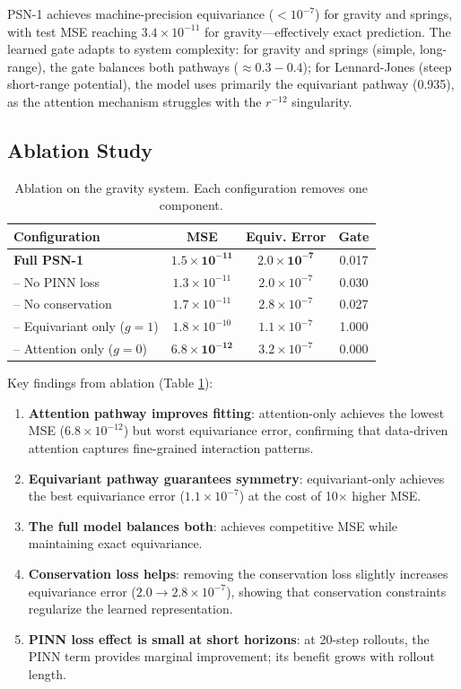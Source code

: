 \documentclass[11pt,a4paper]{article}
\begin{document}
PSN-1 achieves machine-precision equivariance ($<10^{-7}$) for gravity and springs, with test MSE reaching $3.4 \times 10^{-11}$ for gravity---effectively exact prediction. The learned gate adapts to system complexity: for gravity and springs (simple, long-range), the gate balances both pathways ($\approx 0.3-0.4$); for Lennard-Jones (steep short-range potential), the model uses primarily the equivariant pathway (0.935), as the attention mechanism struggles with the $r^{-12}$ singularity.

\subsection{Ablation Study}

\begin{table}[H]
\centering
\caption{Ablation on the gravity system. Each configuration removes one component.}
\label{tab:ablation}
\begin{tabular}{lccc}
\toprule
Configuration & MSE & Equiv. Error & Gate \\
\midrule
\textbf{Full PSN-1} & $\mathbf{1.5 \times 10^{-11}}$ & $\mathbf{2.0 \times 10^{-7}}$ & 0.017 \\
-- No PINN loss & $1.3 \times 10^{-11}$ & $2.0 \times 10^{-7}$ & 0.030 \\
-- No conservation & $1.7 \times 10^{-11}$ & $2.8 \times 10^{-7}$ & 0.027 \\
-- Equivariant only ($g=1$) & $1.8 \times 10^{-10}$ & $1.1 \times 10^{-7}$ & 1.000 \\
-- Attention only ($g=0$) & $\mathbf{6.8 \times 10^{-12}}$ & $3.2 \times 10^{-7}$ & 0.000 \\
\bottomrule
\end{tabular}
\end{table}

Key findings from ablation (Table \ref{tab:ablation}):

\begin{enumerate}[leftmargin=*]
    \item \textbf{Attention pathway improves fitting}: attention-only achieves the lowest MSE ($6.8 \times 10^{-12}$) but worst equivariance error, confirming that data-driven attention captures fine-grained interaction patterns.
    \item \textbf{Equivariant pathway guarantees symmetry}: equivariant-only achieves the best equivariance error ($1.1 \times 10^{-7}$) at the cost of 10$\times$ higher MSE.
    \item \textbf{The full model balances both}: achieves competitive MSE while maintaining exact equivariance.
    \item \textbf{Conservation loss helps}: removing the conservation loss slightly increases equivariance error ($2.0 \to 2.8 \times 10^{-7}$), showing that conservation constraints regularize the learned representation.
    \item \textbf{PINN loss effect is small at short horizons}: at 20-step rollouts, the PINN term provides marginal improvement; its benefit grows with rollout length.
\end{enumerate}
\end{document}

